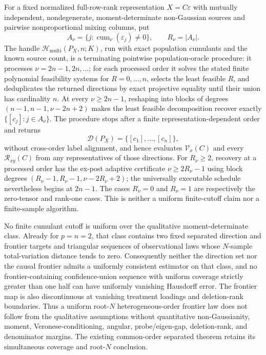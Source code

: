 For a fixed normalized full-row-rank representation \(X=C\varepsilon\) with mutually independent, nondegenerate, moment-determinate non-Gaussian sources and pairwise nonproportional mixing columns, put
\[
 A_\nu=\{j:\operatorname{cum}_\nu(\varepsilon_j)\ne0\},
 \qquad R_\nu=|A_\nu|.
\]
The handle \(\mathcal H_{\mathrm{multi}}(P_X,n;K)\), run with exact population cumulants and the known source count, is a terminating pointwise population-oracle procedure: it processes \(\nu=2n-1,2n,\ldots\); for each processed order it solves the stated finite polynomial feasibility systems for \(R=0,\ldots,n\), selects the least feasible \(R\), and deduplicates the returned directions by exact projective equality until their union has cardinality \(n\). At every \(\nu\ge2n-1\), reshaping into blocks of degrees \((n-1,n-1,\nu-2n+2)\) makes the least feasible decomposition recover exactly \(\{[c_j]:j\in A_\nu\}\). The procedure stops after a finite representation-dependent order and returns
\[
 \mathcal D(P_X)=\{[c_1],\ldots,[c_n]\},
\]
without cross-order label alignment, and hence evaluates \(\mathcal V_x(C)\) and every \(\mathcal R_{xy}(C)\) from any representatives of those directions. For \(R_\nu\ge2\), recovery at a processed order has the ex-post adaptive certificate \(\nu\ge2R_\nu-1\) using block degrees \((R_\nu-1,R_\nu-1,\nu-2R_\nu+2)\); the universally executable schedule nevertheless begins at \(2n-1\). The cases \(R_\nu=0\) and \(R_\nu=1\) are respectively the zero-tensor and rank-one cases. This is neither a uniform finite-cutoff claim nor a finite-sample algorithm.

No finite cumulant cutoff is uniform over the qualitative moment-determinate class. Already for \(p=n=2\), that class contains two fixed separated direction and frontier targets and triangular sequences of observational laws whose \(N\)-sample total-variation distance tends to zero. Consequently neither the direction set nor the causal frontier admits a uniformly consistent estimator on that class, and no frontier-containing confidence-union sequence with uniform coverage strictly greater than one half can have uniformly vanishing Hausdorff error. The frontier map is also discontinuous at vanishing treatment loadings and deletion-rank boundaries. Thus a uniform root-\(N\) heterogeneous-order frontier law does not follow from the qualitative assumptions without quantitative non-Gaussianity, moment, Veronese-conditioning, angular, probe/eigen-gap, deletion-rank, and denominator margins. The existing common-order separated theorem retains its simultaneous coverage and root-\(N\) conclusion.
